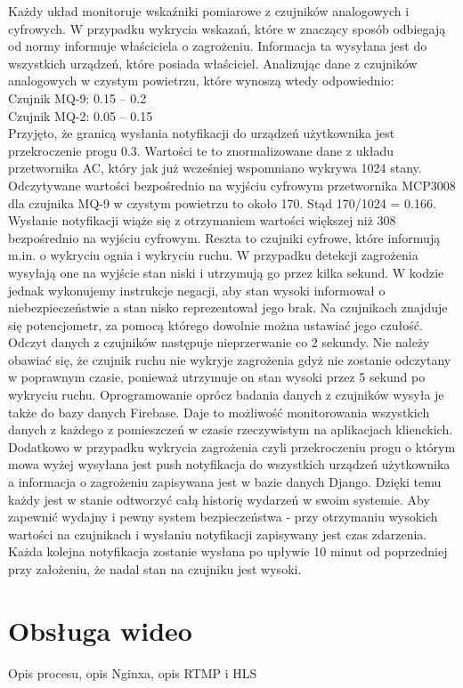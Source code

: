 Każdy układ monitoruje wskaźniki pomiarowe z czujników analogowych i cyfrowych. W przypadku wykrycia wskazań, które w znaczący sposób odbiegają od normy informuje właściciela o zagrożeniu. Informacja ta wysyłana jest do wszystkich urządzeń, które posiada właściciel.  Analizując dane z czujników analogowych w czystym powietrzu, które wynoszą wtedy odpowiednio:\\
Czujnik MQ-9: 0.15 – 0.2\\
Czujnik MQ-2: 0.05 – 0.15\\
Przyjęto, że granicą wysłania notyfikacji do urządzeń użytkownika jest przekroczenie progu 0.3. Wartości te to znormalizowane dane z układu przetwornika AC, który jak już wcześniej wspomniano wykrywa 1024 stany. Odczytywane wartości bezpośrednio na wyjściu cyfrowym przetwornika MCP3008 dla czujnika MQ-9 w czystym powietrzu to około 170. Stąd 170/1024 = 0.166. Wysłanie notyfikacji wiąże się z otrzymaniem wartości większej niż 308 bezpośrednio na wyjściu cyfrowym.
Reszta to czujniki cyfrowe, które informują m.in. o wykryciu ognia i wykryciu ruchu. W przypadku detekcji zagrożenia wysyłają one na wyjście stan niski i utrzymują go przez kilka sekund. W kodzie jednak wykonujemy instrukcje negacji, aby stan wysoki informował o niebezpieczeństwie a stan nisko reprezentował jego brak. Na czujnikach znajduje się potencjometr, za pomocą którego dowolnie można ustawiać jego czułość.
Odczyt danych z czujników następuje nieprzerwanie co 2 sekundy. Nie należy obawiać się, że czujnik ruchu nie wykryje zagrożenia gdyż nie zostanie odczytany w poprawnym czasie, ponieważ utrzymuje on stan wysoki przez 5 sekund po wykryciu ruchu.
Oprogramowanie oprócz badania danych z czujników wysyła je także do bazy danych Firebase. Daje to możliwość monitorowania wszystkich danych z każdego z pomieszczeń w czasie rzeczywistym na aplikacjach klienckich. Dodatkowo w przypadku wykrycia zagrożenia czyli przekroczeniu progu o którym mowa wyżej wysyłana jest push notyfikacja do wszystkich urządzeń użytkownika a informacja o zagrożeniu zapisywana jest w bazie danych Django. Dzięki temu każdy jest w stanie odtworzyć całą historię wydarzeń w swoim systemie.
Aby zapewnić wydajny i pewny system bezpieczeństwa - przy otrzymaniu wysokich wartości na czujnikach i wysłaniu notyfikacji zapisywany jest czas zdarzenia. Każda kolejna notyfikacja zostanie wysłana po upływie 10 minut od poprzedniej przy założeniu, że nadal stan na czujniku jest wysoki. 




















\section*{Obsługa wideo}

Opis procesu, opis Nginxa, opis RTMP i HLS